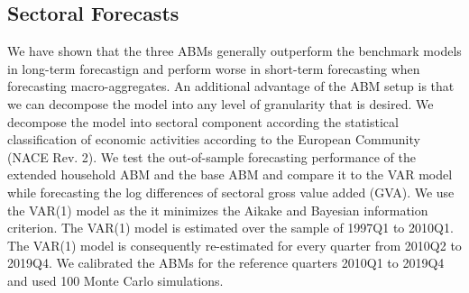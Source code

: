 {\subsection{Sectoral Forecasts}
 We have shown that the three ABMs generally outperform the benchmark models in long-term forecastign and perform worse in short-term forecasting when forecasting macro-aggregates. An additional advantage of the ABM setup is that we can decompose the model into any level of granularity that is desired. We decompose the model into sectoral component according the statistical classification of economic activities according to the European Community (NACE Rev. 2). We test the out-of-sample forecasting performance of the extended household ABM and the base ABM and compare it to the VAR model while forecasting the log differences of sectoral gross value added (GVA). We use the VAR(1) model as the it minimizes the Aikake and Bayesian information criterion. The VAR(1) model is estimated over the sample of 1997Q1 to 2010Q1. The VAR(1) model is consequently re-estimated for every quarter from 2010Q2 to 2019Q4. We calibrated the ABMs for the reference quarters 2010Q1 to 2019Q4 and used 100 Monte Carlo simulations.
\begin{table}[!h]
	\caption{Out-of-sample forecast performance of sectoral gross value added (GVA)} 
	\label{table:rmse_abm_nace10}
	\centering
\end{table}}
